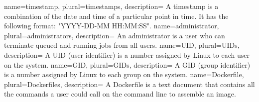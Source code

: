 {
  name=timestamp,
  plural=timestamps,
  description={
    A timestamp is a combination of the date and time of a particular point in time.
    It has the following format: "YYYY-DD-MM HH:MM:SS".
  }
}
{
  name=administrator,
  plural=administrators,
  description={
    An administrator is a user who can terminate queued and running jobs from all users.
  }
}
{
  name=UID,
  plural=UIDs,
  description={
    A UID (user identifier) is a number assigned by Linux to each user on the system.
  }
}
{
  name=GID,
  plural=GIDs,
  description={
    A GID (group identifier) is a number assigned by Linux to each group on the system.
  }
}
{
  name=Dockerfile,
  plural=Dockerfiles,
  description={
     A Dockerfile is a text document that contains all the commands a user could call on the
     command line to assemble an image.
  }
}
